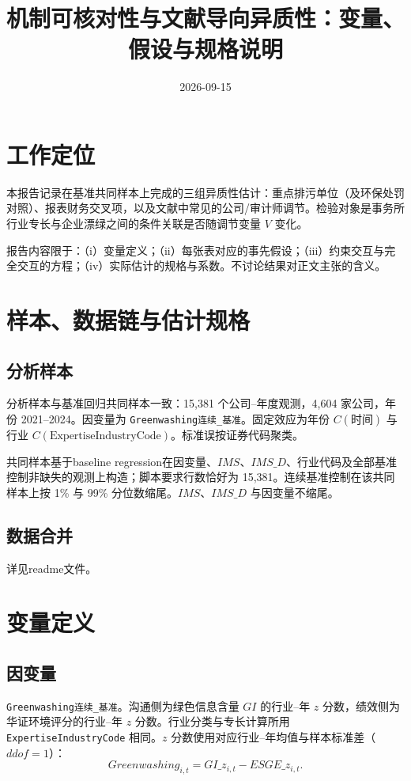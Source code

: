 \documentclass[11pt]{article}
\title{机制可核对性与文献导向异质性：变量、假设与规格说明}
\author{}
\date{2026-09-15}
\begin{document}
\maketitle
\tableofcontents

\section{工作定位}

本报告记录在基准共同样本上完成的三组异质性估计：重点排污单位（及环保处罚对照）、报表财务交叉项，以及文献中常见的公司/审计师调节。检验对象是事务所行业专长与企业漂绿之间的条件关联是否随调节变量 \(V\) 变化。

报告内容限于：（i）变量定义；（ii）每张表对应的事先假设；（iii）约束交互与完全交互的方程；（iv）实际估计的规格与系数。不讨论结果对正文主张的含义。


\section{样本、数据链与估计规格}

\subsection{分析样本}

分析样本与基准回归共同样本一致：15,381 个公司--年度观测，4,604 家公司，年份 2021--2024。因变量为 \texttt{Greenwashing连续\_基准}。固定效应为年份 \(C(\text{时间})\) 与行业 \(C(\text{ExpertiseIndustryCode})\)。标准误按证券代码聚类。

共同样本基于baseline regression在因变量、\(IMS\)、\(IMS\_D\)、行业代码及全部基准控制非缺失的观测上构造；脚本要求行数恰好为 15,381。连续基准控制在该共同样本上按 1\% 与 99\% 分位数缩尾。\(IMS\)、\(IMS\_D\) 与因变量不缩尾。

\subsection{数据合并}
详见readme文件。

\section{变量定义}

\subsection{因变量}

\texttt{Greenwashing连续\_基准}。沟通侧为绿色信息含量 \(GI\) 的行业--年 \(z\) 分数，绩效侧为华证环境评分的行业--年 \(z\) 分数。行业分类与专长计算所用 \texttt{ExpertiseIndustryCode} 相同。\(z\) 分数使用对应行业--年均值与样本标准差（\(ddof=1\)）：
\[
Greenwashing_{i,t}=GI\_z_{i,t}-ESGE\_z_{i,t}.
\]
\end{document}
